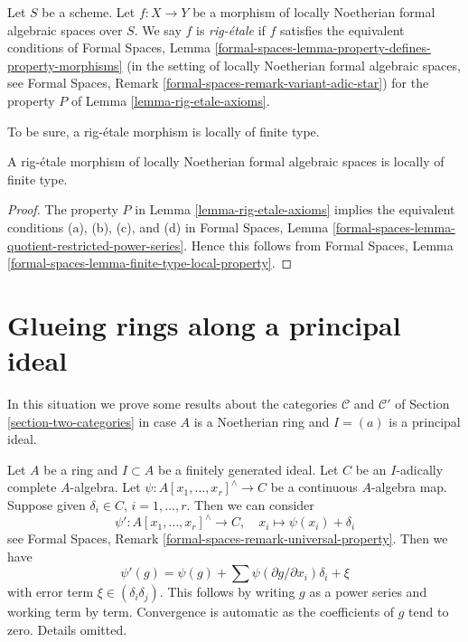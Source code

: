 \begin{definition}
\label{definition-rig-etale}
Let $S$ be a scheme. Let $f : X \to Y$ be a morphism of locally
Noetherian formal algebraic spaces over $S$. We say $f$ is
{\it rig-\'etale} if $f$ satisfies the equivalent conditions of
Formal Spaces, Lemma
\ref{formal-spaces-lemma-property-defines-property-morphisms}
(in the setting of locally Noetherian formal algebraic spaces, see
Formal Spaces, Remark \ref{formal-spaces-remark-variant-adic-star})
for the property $P$ of Lemma \ref{lemma-rig-etale-axioms}.
\end{definition}

\noindent
To be sure, a rig-\'etale morphism is locally of finite type.

\begin{lemma}
\label{lemma-rig-etale-finite-type}
A rig-\'etale morphism of locally Noetherian formal algebraic spaces
is locally of finite type.
\end{lemma}

\begin{proof}
The property $P$ in Lemma \ref{lemma-rig-etale-axioms}
implies the equivalent conditions (a), (b), (c), and (d) in
Formal Spaces, Lemma
\ref{formal-spaces-lemma-quotient-restricted-power-series}.
Hence this follows from
Formal Spaces, Lemma \ref{formal-spaces-lemma-finite-type-local-property}.
\end{proof}








\section{Glueing rings along a principal ideal}
\label{section-approximation-principal}

\noindent
In this situation we prove some results about the categories
$\mathcal{C}$ and $\mathcal{C}'$ of
Section \ref{section-two-categories}
in case $A$ is a Noetherian ring and $I = (a)$ is a principal
ideal.

\begin{remark}
\label{remark-linear-approximation}
Let $A$ be a ring and $I \subset A$ be a finitely generated ideal.
Let $C$ be an $I$-adically complete $A$-algebra.
Let $\psi : A[x_1, \ldots, x_r]^\wedge \to C$ be a continuous
$A$-algebra map. Suppose given $\delta_i \in C$, $i = 1, \ldots, r$.
Then we can consider
$$
\psi' : A[x_1, \ldots, x_r]^\wedge \to C,\quad
x_i \longmapsto \psi(x_i) + \delta_i
$$
see Formal Spaces, Remark \ref{formal-spaces-remark-universal-property}.
Then we have
$$
\psi'(g) = \psi(g) + \sum \psi(\partial g/\partial x_i)\delta_i + \xi
$$
with error term $\xi \in (\delta_i\delta_j)$. This follows by
writing $g$ as a power series and working term by term. Convergence
is automatic as the coefficients of $g$ tend to zero.
Details omitted.
\end{remark}

